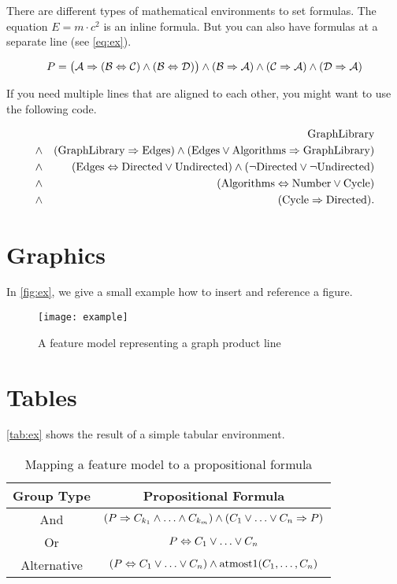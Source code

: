 There are different types of mathematical environments to set formulas. The equation $E=m\cdot c^2$ is an inline formula. But you can also have formulas at a separate line (see \vref{eq:ex}).

	\begin{equation}\label{eq:ex}
			P=\bigl(\mathcal{A}\Rightarrow(\mathcal{B}\Leftrightarrow\mathcal{C})\wedge(\mathcal{B}\Leftrightarrow\mathcal{D})\bigr)\wedge(\mathcal{B}\Rightarrow\mathcal{A})\wedge(\mathcal{C}\Rightarrow\mathcal{A})\wedge(\mathcal{D}\Rightarrow\mathcal{A})
	\end{equation}

If you need multiple lines that are aligned to each other, you might want to use the following code.

	\newcommand{\fG}{\mbox{GraphLibrary}}
	\newcommand{\fE}{\mbox{Edges}}
	\newcommand{\fA}{\mbox{Algorithms}}
	\newcommand{\fD}{\mbox{Directed}}
	\newcommand{\fU}{\mbox{Undirected}}
	\newcommand{\fN}{\mbox{Number}}
	\newcommand{\fC}{\mbox{Cycle}}
	\begin{eqnarray*}
	&& \fG\\
	&\pand& (\fG \pimplies \fE) \pand (\fE \por \fA \pimplies \fG)\\
	&\pand& (\fE \pequals \fD \por \fU) \pand (\pnot \fD \por \pnot \fU)\\
	&\pand& (\fA \pequals \fN \por \fC)\\
	&\pand& (\fC \pimplies \fD).\\
	\end{eqnarray*}

\section{Graphics}

In \vref{fig:ex}, we give a small example how to insert and reference a figure.

\begin{figure}[htbp]
	\centering
		\texttt{[image: example]}
	\caption{A feature model representing a graph product line}
	\label{fig:ex}
\end{figure}

\section{Tables}

\vref{tab:ex} shows the result of a simple tabular environment.

\begin{table}[htbp]
	\centering
		\begin{tabular}{cc}\toprule
			Group Type & Propositional Formula\\\midrule
			And & $(P \Rightarrow C_{k_1} \wedge\ldots\wedge C_{k_m}) \wedge (C_1\vee\ldots\vee C_n \Rightarrow P)$\\\addlinespace
			Or & $P \Leftrightarrow C_1\vee\ldots\vee C_n$\\\addlinespace
			Alternative & $(P \Leftrightarrow C_1\vee\ldots\vee C_n) \wedge \mbox{atmost}1(C_1,\ldots,C_n)$\\
			\bottomrule
		\end{tabular}
	\caption{Mapping a feature model to a propositional formula}
	\label{tab:ex}
\end{table}

